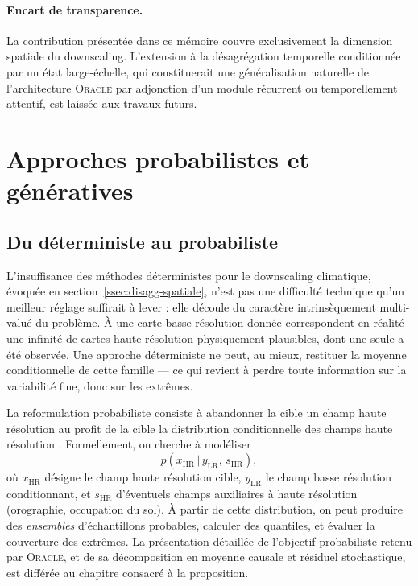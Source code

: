 \documentclass[14pt,a4paper,openany]{extreport}
\theoremstyle{definition}
\newcommand{\Oracle}{\textsc{Oracle}}
\newcommand{\LR}{\ensuremath{\text{LR}}}
\newcommand{\HR}{\ensuremath{\text{HR}}}
\newcommand{\xHR}{\ensuremath{x_{\HR}}}
\newcommand{\yLR}{\ensuremath{y_{\LR}}}
\begin{document}
\paragraph{Encart de transparence.}
La contribution présentée dans ce mémoire couvre exclusivement la dimension spatiale du downscaling. L'extension à la désagrégation temporelle conditionnée par un état large-échelle, qui constituerait une généralisation naturelle de l'architecture \Oracle{} par adjonction d'un module récurrent ou temporellement attentif, est laissée aux travaux futurs.

\section{Approches probabilistes et génératives}
\label{sec:generatifs}

\subsection{Du déterministe au probabiliste}
\label{ssec:det-vs-proba}

L'insuffisance des méthodes déterministes pour le downscaling climatique, évoquée en section~\ref{ssec:disagg-spatiale}, n'est pas une difficulté technique qu'un meilleur réglage suffirait à lever : elle découle du caractère intrinsèquement multi-valué du problème. À une carte basse résolution donnée correspondent en réalité une infinité de cartes haute résolution physiquement plausibles, dont une seule a été observée. Une approche déterministe ne peut, au mieux, restituer la moyenne conditionnelle de cette famille --- ce qui revient à perdre toute information sur la variabilité fine, donc sur les extrêmes.

La reformulation probabiliste consiste à abandonner la cible \og un champ haute résolution \fg{} au profit de la cible \og la distribution conditionnelle des champs haute résolution \fg{}. Formellement, on cherche à modéliser
\begin{equation}
  p\!\left(\xHR \,\big|\, \yLR,\, s_{\HR}\right),
  \label{eq:objectif-proba}
\end{equation}
où $\xHR$ désigne le champ haute résolution cible, $\yLR$ le champ basse résolution conditionnant, et $s_{\HR}$ d'éventuels champs auxiliaires à haute résolution (orographie, occupation du sol). À partir de cette distribution, on peut produire des \emph{ensembles} d'échantillons probables, calculer des quantiles, et évaluer la couverture des extrêmes. La présentation détaillée de l'objectif probabiliste retenu par \Oracle{}, et de sa décomposition en moyenne causale et résiduel stochastique, est différée au chapitre consacré à la proposition.
\end{document}
